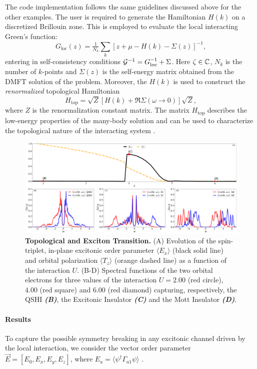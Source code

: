 \documentclass[edipack_sp.tex]{subfiles}
\begin{document}
The code implementation follows the same guidelines discussed above for the other examples. The user is required to generate the Hamiltonian $H(k)$ on a discretized Brillouin zone. 
This is employed to evaluate the local interacting Green's function:
$$
G_\mathrm{loc}(z) = \tfrac{1}{N_k}\sum_k \left[z+\mu-H(k)-\Sigma(z)
\right]^{-1}, 
$$
entering in self-consistency conditions ${\cal G}^{-1}=G_\mathrm{loc}^{-1}+\Sigma$. 
Here  $\zeta\in\mathbb{C}$, $N_k$ is the number of $k$-points   and $\Sigma(z)$ is the self-energy matrix  obtained from the DMFT solution of the problem.  
Moreover, the $H(k)$ is used to  construct the {\it renormalized} topological Hamiltonian \cite{Wang2010PRL,Wang2012PRX,Blason2023PRB}
$$
H_\mathrm{top} = \sqrt{Z}[H(k) + \Re\Sigma(\omega\to0)]\sqrt{Z}, 
$$
where $Z$ is the renormalization constant matrix. The matrix $H_\mathrm{top}$ describes the
low-energy properties of the many-body solution and can be used to characterize the topological nature of the interacting system  \cite{Gurarie2011PRB,Wang2012PRX,Wagner2023NC,Blason2023PRB,Bau2024PRB}.  




\begin{figure}[t!]
  \includegraphics[width=\linewidth]{figures/figBHZ.pdf}
    \caption{\label{figEx4}%
      \textbf{Topological and Exciton Transition.}
      (A) Evolution of the spin-triplet,
      in-plane excitonic order parameter $\langle E_x\rangle$ (black solid line) and
      orbital polarization $\langle T_z\rangle$ (orange dashed line) as a function of the
      interaction $U$.
      (B-D) Spectral functions of the two orbital electrons for three
      values of the interaction $U=2.00$ (red circle), $4.00$ (red
      square) and $6.00$ (red diamond) capturing, respectively, the
      QSHI \textbf{\textit{(B)}}, the Excitonic Insulator \textbf{\textit{(C)}} and the Mott Insulator
      \textbf{\textit{(D)}}. 
    }
\end{figure}

\paragraph{Results}
To capture the possible symmetry breaking in any excitonic channel
driven by the local interaction, we consider the vector order
parameter
$\vec{E}=[E_0,E_x,E_y,E_z]$, where $E_a=\langle\psi^\dagger
\Gamma_{a1}\psi \rangle$ \cite{Budich2014PRL,Kunes2014PRB,Kaneko2015JOPCS,Kunes2015JOPCM,Knolle2017PRL,Guerci2019PRM,Geffroy2019PRL,Mazza2020PRL,De-Palo2023PRB}.
\end{document}
